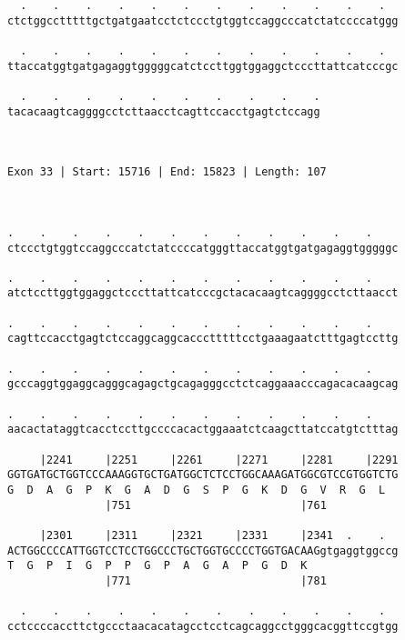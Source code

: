 \documentclass{article}
\begin{document}
\begin{Verbatim}
  .    .    .    .    .    .    .    .    .    .    .    .  
ctctggcctttttgctgatgaatcctctccctgtggtccaggcccatctatccccatggg
                                                            
  .    .    .    .    .    .    .    .    .    .    .    .  
ttaccatggtgatgagaggtgggggcatctccttggtggaggctcccttattcatcccgc
                                                            
  .    .    .    .    .    .    .    .    .    .
tacacaagtcaggggcctcttaacctcagttccacctgagtctccagg
                                                
                                                
 
Exon 33 | Start: 15716 | End: 15823 | Length: 107



.    .    .    .    .    .    .    .    .    .    .    .    
ctccctgtggtccaggcccatctatccccatgggttaccatggtgatgagaggtgggggc
                                                            
.    .    .    .    .    .    .    .    .    .    .    .    
atctccttggtggaggctcccttattcatcccgctacacaagtcaggggcctcttaacct
                                                            
.    .    .    .    .    .    .    .    .    .    .    .    
cagttccacctgagtctccaggcaggcaccctttttcctgaaagaatctttgagtccttg
                                                            
.    .    .    .    .    .    .    .    .    .    .    .    
gcccaggtggaggcagggcagagctgcagagggcctctcaggaaacccagacacaagcag
                                                            
.    .    .    .    .    .    .    .    .    .    .    .    
aacactataggtcacctccttgccccacactggaaatctcaagcttatccatgtctttag
                                                            
     |2241     |2251     |2261     |2271     |2281     |2291
GGTGATGCTGGTCCCAAAGGTGCTGATGGCTCTCCTGGCAAAGATGGCGTCCGTGGTCTG
G  D  A  G  P  K  G  A  D  G  S  P  G  K  D  G  V  R  G  L  
               |751                          |761           
  
     |2301     |2311     |2321     |2331     |2341  .    .  
ACTGGCCCCATTGGTCCTCCTGGCCCTGCTGGTGCCCCTGGTGACAAGgtgaggtggccg
T  G  P  I  G  P  P  G  P  A  G  A  P  G  D  K              
               |771                          |781           
  
  .    .    .    .    .    .    .    .    .    .    .    .  
cctccccaccttctgccctaacacatagcctcctcagcaggcctgggcacggttccgtgg
                                                            

\end{Verbatim}
\end{document}

